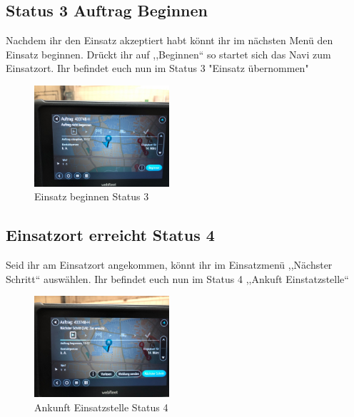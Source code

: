 \documentclass[a4paper,12pt]{scrartcl}
\begin{document}
    \subsection{Status 3 Auftrag Beginnen}
    Nachdem ihr den Einsatz akzeptiert habt könnt ihr im nächsten Menü den Einsatz beginnen. Drückt ihr auf ,,Beginnen``
    so startet sich das Navi zum Einsatzort. Ihr befindet euch nun im Status 3 "Einsatz übernommen"
    \begin{figure}[h]
        \begin{center}
            \includegraphics[width=5cm]{bilder/beginnen.jpg}
            \caption{Einsatz beginnen Status 3}
            \label{beginnen}
        \end{center}     
    \end{figure}
    
    \newpage
    \subsection{Einsatzort erreicht Status 4}
    Seid ihr am Einsatzort angekommen, könnt ihr im Einsatzmenü ,,Nächster Schritt`` auswählen. Ihr befindet euch nun im Status 4 ,,Ankuft Einstatzstelle``
    \begin{figure}[h]
        \begin{center}
            \includegraphics[width=5cm]{bilder/einsatzort.jpg}
            \caption{Ankunft Einsatzstelle Status 4}
            \label{ankunft Einsatzstelle}
        \end{center} 
    \end{figure}
    
\end{document}
